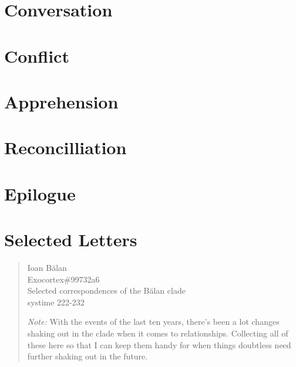 \documentclass[11pt]{memoir}
\begin{document}
  \part{Conversation}

  
  
  
  
  
  
  
  

  \part{Conflict}

  
  
  
  
  
  
  
  
  

  \part{Apprehension}

  
  
  
  
  
  
  
  
  
  
  

  \part{Reconcilliation}

  
  
  
  
  
  
  
  

  \part*{Epilogue}

  

  \part*{Selected Letters}

  \begin{quote}
    Ioan Bălan \\
    Exocortex\#99732a6 \\
    Selected correspondences of the Bălan clade \\
    systime 222-232
    
    \emph{Note:} With the events of the last ten years, there's been a lot changes shaking out in the clade when it comes to relationships. Collecting all of these here so that I can keep them handy for when things doubtless need further shaking out in the future.
  \end{quote}

  

  \backmatter

  \markboth{}{}


  
\end{document}
